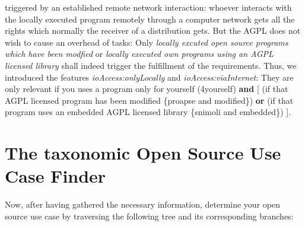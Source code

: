 \begin{description}
triggered by an established remote network interaction: whoever interacts with
the locally executed program remotely through a computer network gets all the
rights which normally the receiver of a distribution gets. But the AGPL does not
wish to cause an overhead of tasks: Only \emph{locally excuted open source
programs which have been modfied} or \emph{locally executed own programs using
an AGPL licensed library} shall indeed trigger the fulfillment of the
requirements. Thus, we introduced the features \emph{ioAccess:onlyLocally} and
\emph{ioAccess:viaInternet}: They are only relevant if you uses a program only
for yourself (4yourself) \textbf{and} [ (if that AGPL licensed program has been
modified \{proapse and modified\}) \textbf{or} (if that program uses an embedded
AGPL licensed library \{snimoli and embedded\}) ].

\end{description}

\section{The taxonomic Open Source Use Case Finder}

Now, after having gathered the necessary information, determine your 
open source use case by traversing the following tree and its corresponding
branches:

